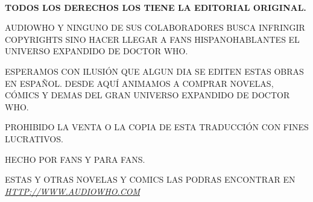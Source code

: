 \clearpage
~
\vfill
\begin{center}

\textbf{TODOS LOS DERECHOS LOS TIENE LA EDITORIAL ORIGINAL.}

\vspace{2mm}

AUDIOWHO Y NINGUNO DE SUS COLABORADORES BUSCA INFRINGIR COPYRIGHTS SINO HACER LLEGAR A FANS HISPANOHABLANTES EL UNIVERSO EXPANDIDO DE DOCTOR WHO.

\vspace{2mm}

ESPERAMOS CON ILUSIÓN QUE ALGUN DIA SE EDITEN ESTAS OBRAS EN ESPAÑOL. DESDE AQUÍ ANIMAMOS A COMPRAR NOVELAS, CÓMICS Y DEMAS DEL GRAN UNIVERSO EXPANDIDO DE DOCTOR WHO.

\vspace{2mm}

PROHIBIDO LA VENTA O LA COPIA DE ESTA TRADUCCIÓN CON FINES LUCRATIVOS.

\vspace{2mm}

HECHO POR FANS Y PARA FANS.

\vspace{2mm}

ESTAS Y OTRAS NOVELAS Y COMICS LAS PODRAS ENCONTRAR EN  \href{http://www.audiowho.com}{\textit{HTTP://WWW.AUDIOWHO.COM}}
\end{center}